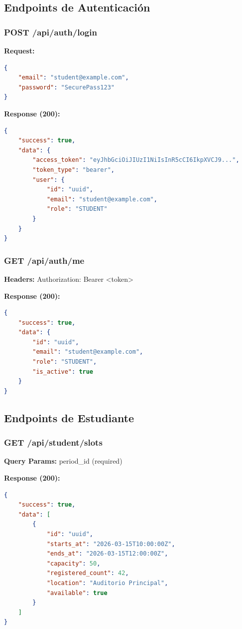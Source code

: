 \documentclass[12pt,a4paper]{article}
\begin{document}
\subsection{Endpoints de Autenticación}

\subsubsection{POST /api/auth/login}

\textbf{Request:}
\begin{lstlisting}[language=json]
{
    "email": "student@example.com",
    "password": "SecurePass123"
}
\end{lstlisting}

\textbf{Response (200):}
\begin{lstlisting}[language=json]
{
    "success": true,
    "data": {
        "access_token": "eyJhbGciOiJIUzI1NiIsInR5cCI6IkpXVCJ9...",
        "token_type": "bearer",
        "user": {
            "id": "uuid",
            "email": "student@example.com",
            "role": "STUDENT"
        }
    }
}
\end{lstlisting}

\subsubsection{GET /api/auth/me}

\textbf{Headers:} Authorization: Bearer <token>

\textbf{Response (200):}
\begin{lstlisting}[language=json]
{
    "success": true,
    "data": {
        "id": "uuid",
        "email": "student@example.com",
        "role": "STUDENT",
        "is_active": true
    }
}
\end{lstlisting}

\subsection{Endpoints de Estudiante}

\subsubsection{GET /api/student/slots}

\textbf{Query Params:} period\_id (required)

\textbf{Response (200):}
\begin{lstlisting}[language=json]
{
    "success": true,
    "data": [
        {
            "id": "uuid",
            "starts_at": "2026-03-15T10:00:00Z",
            "ends_at": "2026-03-15T12:00:00Z",
            "capacity": 50,
            "registered_count": 42,
            "location": "Auditorio Principal",
            "available": true
        }
    ]
}
\end{lstlisting}
\end{document}
